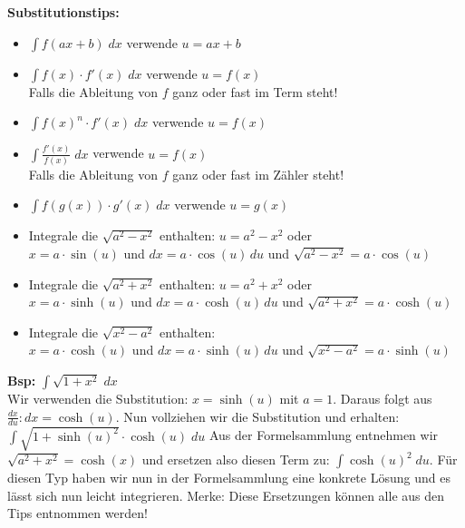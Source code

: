 \textbf{Substitutionstips:}
{\small
\begin{itemize}
	\item $\int f(ax + b) \; dx$ verwende $u = ax + b$
	\vspace{0.1cm}
	
	\item $\int f(x) \cdot f'(x) \; dx$ verwende $u = f(x)$\\
	Falls die Ableitung von $f$ ganz oder fast im Term steht!
	\vspace{0.1cm}
	
	\item $\int f(x)^n \cdot f'(x) \; dx$ verwende $u = f(x)$
	\vspace{0.1cm}

	\item $\int \frac{f'(x)}{f(x)} \; dx$ verwende $u = f(x)$\\
	Falls die Ableitung von $f$ ganz oder fast im Zähler steht!
	\vspace{0.1cm}

	\item $\int f(g(x)) \cdot g'(x) \; dx$ verwende $u = g(x)$
	\vspace{0.1cm}
	
	\item Integrale die $\sqrt{a^2 - x^2}$ enthalten: $u = a^2 - x^2$ oder\\
	$x = a \cdot \sin(u) $ und $dx = a \cdot \cos(u) \, du$ und $\sqrt{a^2 - x^2} = a \cdot \cos(u)$
	\vspace{0.1cm}

	\item Integrale die $\sqrt{a^2 + x^2}$ enthalten: $u = a^2 + x^2$ oder\\
	$x = a \cdot \sinh(u) $ und $dx = a \cdot \cosh(u) \, du$ und $\sqrt{a^2 + x^2} = a \cdot \cosh(u)$

	\vspace{0.1cm}
	\item Integrale die $\sqrt{x^2 - a^2}$ enthalten:\\
	$x = a \cdot \cosh(u) $ und $dx = a \cdot \sinh(u) \, du$ und $\sqrt{x^2 - a^2} = a \cdot \sinh(u)$
\end{itemize}
\textbf{Bsp:} $\int \sqrt{1 + x^2} \; dx$\\
Wir verwenden die Substitution: $x = \sinh(u)$ mit $a = 1$. Daraus folgt aus $\frac{dx}{du}: dx = \cosh(u)$. 
Nun vollziehen wir die Substitution und erhalten: $\int \sqrt{1 + \sinh(u)^2} \cdot \cosh(u) \; du$
Aus der Formelsammlung entnehmen wir $\sqrt{a^2 + x^2} = \cosh(x)$ und ersetzen also diesen Term zu:  
$\int \cosh(u)^2 \; du$. Für diesen Typ haben wir nun in der Formelsammlung eine konkrete Lösung und es lässt sich nun leicht integrieren. Merke: Diese Ersetzungen können alle aus den Tips entnommen werden!
}


